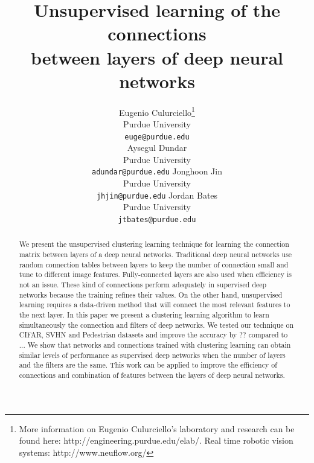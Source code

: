 \documentclass{article} %
\begin{document}
\title{Unsupervised learning of the connections  \\ between layers of deep neural networks}

\author{
Eugenio Culurciello\thanks{More information on Eugenio Culurciello's laboratory and research can be found here: http://engineering.purdue.edu/elab/. Real time robotic vision systems: http://www.neuflow.org/} \\
Purdue University\\
\texttt{euge@purdue.edu} \\
\And
Aysegul Dundar \\
Purdue University\\
\texttt{adundar@purdue.edu}
\AND
Jonghoon Jin \\
Purdue University\\
\texttt{jhjin@purdue.edu}
\And
Jordan Bates \\
Purdue University\\
\texttt{jtbates@purdue.edu}
}


\maketitle

\begin{abstract}
We present the unsupervised clustering learning technique for learning the connection matrix between layers of a deep neural networks. Traditional deep neural networks use random connection tables between layers to keep the number of  connection small and tune to different image features. Fully-connected layers are also used when efficiency is not an issue. These kind of connections perform adequately in supervised deep networks because the training refines their values. 
On the other hand, unsupervised learning requires a data-driven method that will connect the most relevant features to the next layer. In this paper we present a clustering learning algorithm to learn simultaneously the connection and filters of deep networks. We tested our technique on CIFAR, SVHN and Pedestrian datasets and improve the accuracy by ?? compared to ... We show that networks and connections trained with clustering learning can obtain similar levels of performance as supervised deep networks when the number of layers and the filters are the same. 
This work can be applied to improve the efficiency of connections and combination of features between the layers of deep neural networks.
\end{abstract}
\end{document}
